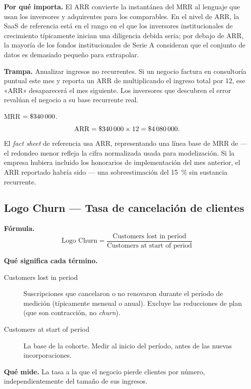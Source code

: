 \textbf{Por qué importa.} El ARR convierte la instantánea del MRR al lenguaje que usan los
inversores y adquirentes para los comparables. En el nivel de  ARR, la SaaS
de referencia está en el rango en el que los inversores institucionales de crecimiento
típicamente inician una diligencia debida seria; por debajo de  ARR, la
mayoría de los fondos institucionales de Serie A consideran que el conjunto de datos es
demasiado pequeño para extrapolar.

\textbf{Trampa.} Anualizar ingresos no recurrentes. Si un negocio factura  en
consultoría puntual este mes y reporta un ARR de  multiplicando el ingreso
total por 12, ese «ARR» desaparecerá el mes siguiente. Los inversores que descubren el error
revalúan el negocio a su base recurrente real.

\begin{example}
MRR $= \$\num{340000}$.
\[
  \mathrm{ARR} = \$\num{340000} \times 12 = \$\num{4080000}.
\]
El \emph{fact sheet} de referencia usa  ARR, representando una línea base de
MRR de  --- el redondeo menor refleja la cifra normalizada usada para
modelización. Si la empresa hubiera incluido los honorarios de implementación del mes
anterior, el ARR reportado habría sido  --- una sobreestimación del
\qty{15}{\percent} sin sustancia recurrente.
\end{example}


\subsection{Logo Churn --- Tasa de cancelación de clientes}

\textbf{Fórmula.}
\[
  \text{Logo Churn} = \frac{\text{Customers lost in period}}{\text{Customers at start of period}}
\]

\textbf{Qué significa cada término.}
\begin{description}
  \item[Customers lost in period] Suscripciones que cancelaron o no renovaron durante el
    período de medición (típicamente mensual o anual). Excluye las reducciones de plan
    (que son contracción, no \emph{churn}).
  \item[Customers at start of period] La base de la cohorte. Medir al inicio del período,
    antes de las nuevas incorporaciones.
\end{description}

\textbf{Qué mide.} La tasa a la que el negocio pierde clientes por número, independientemente
del tamaño de sus ingresos.

